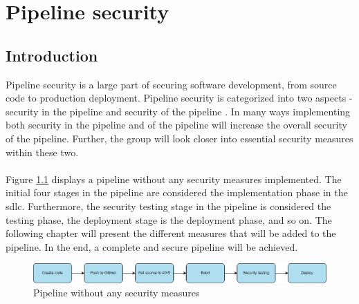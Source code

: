 \newpage
\thispagestyle{empty}
\mbox{}
\chapter{Pipeline security}
\label{Pipeline security}
\section{Introduction}
Pipeline security is a large part of securing software development, from source code to production deployment. Pipeline security is categorized into two aspects - security in the pipeline and security of the pipeline \cite{inofpipeline}. In many ways implementing both security in the pipeline and of the pipeline will increase the overall security of the pipeline. Further, the group will look closer into essential security measures within these two. 
\\~\\
Figure \ref{fig: Pipeline without any security measures} displays a \gls{pipeline} without any security measures implemented. The initial four stages in the pipeline are considered the implementation phase in the \acrshort{sdlc}. Furthermore, the security testing stage in the pipeline is considered the testing phase, the deployment stage is the deployment phase, and so on. The following chapter will present the different measures that will be added to the pipeline. In the end, a complete and secure pipeline will be achieved.

\vspace{2mm}
\begin{figure}[H]
    \centering
    \includegraphics[width=0.8\columnwidth]{Images/SecurePipeline-Page-3.drawio.png}
    \caption{Pipeline without any security measures}
    \label{fig: Pipeline without any security measures}
\end{figure}





